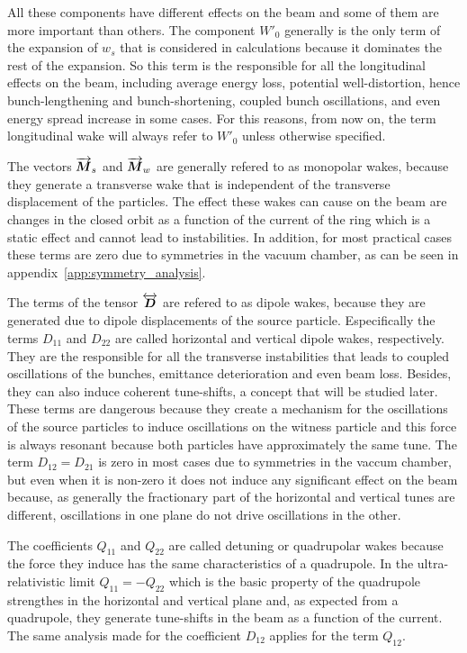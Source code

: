     All these components have different effects on the beam and some of them are more important than others. The component $W'_0$ generally is the only term of the expansion of $w_s$ that is considered in calculations because it dominates the rest of the expansion. So this term is the responsible for all the longitudinal effects on the beam, including average energy loss, potential well-distortion, hence bunch-lengthening and bunch-shortening, coupled bunch oscillations, and even energy spread increase in some cases. For this reasons, from now on, the term longitudinal wake will always refer to $W'_0$ unless otherwise specified.

    The vectors $\overrightarrow{\boldsymbol{M}}_s$ and $\overrightarrow{\boldsymbol{M}}_w$ are generally refered to as monopolar wakes, because they generate a transverse wake that is independent of the transverse displacement of the particles. The effect these wakes can cause on the beam are changes in the closed orbit as a function of the current of the ring which is a static effect and cannot lead to instabilities. In addition, for most practical cases these terms are zero due to symmetries in the vacuum chamber, as can be seen in appendix~\ref{app:symmetry_analysis}.

    The terms of the tensor $\overleftrightarrow{\boldsymbol{D}}$ are refered to as dipole wakes, because they are generated due to dipole displacements of the source particle. Especifically the terms $D_{11}$ and $D_{22}$ are called horizontal and vertical dipole wakes, respectively. They are the responsible for all the transverse instabilities that leads to coupled oscillations of the bunches, emittance deterioration and even beam loss. Besides, they can also induce coherent tune-shifts, a concept that will be studied later. These terms are dangerous because they create a mechanism for the oscillations of the source particles to induce oscillations on the witness particle and this force is always resonant because both particles have approximately the same tune. The term $D_{12}=D_{21}$ is zero in most cases due to symmetries in the vaccum chamber, but even when it is non-zero it does not induce any significant effect on the beam because, as generally the fractionary part of the horizontal and vertical tunes are different, oscillations in one plane do not drive oscillations in the other.

    The coefficients $Q_{11}$ and $Q_{22}$ are called detuning or quadrupolar wakes because the force they induce has the same characteristics of a quadrupole. In the ultra-relativistic limit $Q_{11}=-Q_{22}$ which is the basic property of the quadrupole strengthes in the horizontal and vertical plane and, as expected from a quadrupole, they generate tune-shifts in the beam as a function of the current. The same analysis made for the coefficient $D_{12}$ applies for the term $Q_{12}$.

